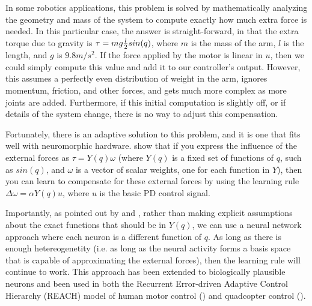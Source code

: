\documentclass{frontiersSCNS} %
\begin{document}
In some robotics applications, this problem is solved by mathematically
analyzing the geometry and mass of the system to compute exactly how much extra
force is needed.  In this particular case, the answer is straight-forward,
in that the extra torque due to gravity is $\tau=mg {l \over 2} sin(q)$, where
$m$ is the mass of the arm, $l$ is the length, and $g$ is $9.8m/s^2$.  If the
force applied by the motor is linear in $u$, then we could simply compute this
value and add it to our controller's output.  However, this assumes a perfectly
even distribution of weight in the arm, ignores momentum, friction, and other forces, and 
gets much more complex as more joints are added.  Furthermore, if this
initial computation is slightly off, or if details of the system change,
there is no way to adjust this compensation.

Fortunately, there is an adaptive solution to this problem, and it is one that
fits well with neuromorphic hardware.  \cite{Slotine1987} show that if you
express the influence of the external forces as $\tau=Y(q) \omega$
(where $Y(q)$ is a fixed set of functions of $q$, such as $sin(q)$, and $\omega$
is a vector of scalar weights, one for each function in $Y$), then you can learn
to compensate for these external forces by using the learning rule $\Delta \omega = \alpha Y(q) u$,
where $u$ is the basic PD control signal.

Importantly, as pointed out by \cite{SannerSlotine1992} and \cite{Lewis1996}, rather than making explicit
assumptions about the exact functions that should be in $Y(q)$, we can use
a neural network approach where each neuron is a different function of $q$.  
As long as there is enough hetereogenetity (i.e. as long as the neural activity
forms a basis space that is capable of approximating the external forces), then the
learning rule will continue to work.  This approach has been extended to
biologically plausible neurons and been used in both the
Recurrent Error-driven Adaptive Control Hierarchy (REACH) model of human motor control
(\citealt{dewolf2014}) and quadcopter control (\citealt{KomerThesis}).
\end{document}
